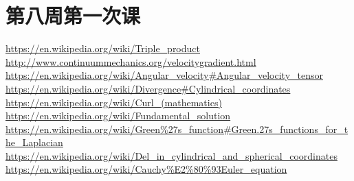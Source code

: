 \documentclass{article}
\numberwithin{equation}{section}
\begin{document}
\section{第八周第一次课}

\begin{thebibliography}{99}
 \href{https://en.wikipedia.org/wiki/Triple_product}{https://en.wikipedia.org/wiki/Triple\_product}
\href{http://www.continuummechanics.org/velocitygradient.html}{http://www.continuummechanics.org/velocitygradient.html}
\href{https://en.wikipedia.org/wiki/Angular_velocity#Angular_velocity_tensor}{https://en.wikipedia.org/wiki/Angular\_velocity\#Angular\_velocity\_tensor}
\href{https://en.wikipedia.org/wiki/Divergence#Cylindrical_coordinates}{https://en.wikipedia.org/wiki/Divergence\#Cylindrical\_coordinates}
\href{https://en.wikipedia.org/wiki/Curl_(mathematics)}{https://en.wikipedia.org/wiki/Curl\_(mathematics)}
\href{https://en.wikipedia.org/wiki/Fundamental_solution}{https://en.wikipedia.org/wiki/Fundamental\_solution}
\href{https://en.wikipedia.org/wiki/Green\%27s_function#Green.27s_functions_for_the_Laplacian}{https://en.wikipedia.org/wiki/Green\%27s\_function\#Green.27s\_functions\_for\_the\_Laplacian}
\href{https://en.wikipedia.org/wiki/Del_in_cylindrical_and_spherical_coordinates}{https://en.wikipedia.org/wiki/Del\_in\_cylindrical\_and\_spherical\_coordinates}
\href{https://en.wikipedia.org/wiki/Cauchy\%E2\%80\%93Euler_equation}{https://en.wikipedia.org/wiki/Cauchy\%E2\%80\%93Euler\_equation}
\end{thebibliography}
\printglossaries
\end{document}
